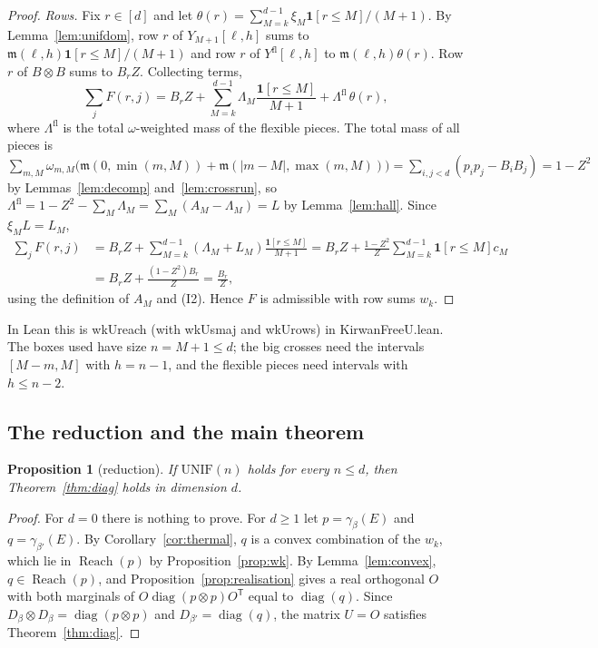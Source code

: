 \documentclass[11pt]{amsart}
\newtheorem{proposition}[lemma]{Proposition}
\theoremstyle{definition}
\theoremstyle{remark}
\numberwithin{equation}{section}
\newcommand{\diag}{\operatorname{diag}}
\newcommand{\Reach}{\operatorname{Reach}}
\newcommand{\ind}[1]{\mathbf{1}[#1]}
\newcommand{\ms}{\mathfrak{m}}
\newcommand{\leanus}{\textunderscore\allowbreak}
\newcommand{\lean}[1]{{\ttfamily\let\_\leanus #1}}
\begin{document}
\begin{proof}
\emph{Rows.} Fix $r\in[d]$ and let $\theta(r)=\sum_{M=k}^{d-1}\xi_M\ind{r\le M}/(M+1)$. By
Lemma~\ref{lem:unifdom}, row $r$ of $Y_{M+1}[\ell,h]$ sums to $\ms(\ell,h)\ind{r\le M}/(M+1)$ and row
$r$ of $Y^{\mathrm{fl}}[\ell,h]$ to $\ms(\ell,h)\theta(r)$. Row $r$ of $B\otimes B$ sums to $B_rZ$.
Collecting terms,
\[
  \sum_jF(r,j)=B_rZ+\sum_{M=k}^{d-1}\Lambda_M\frac{\ind{r\le M}}{M+1}+\Lambda^{\mathrm{fl}}\,\theta(r),
\]
where $\Lambda^{\mathrm{fl}}$ is the total $\omega$-weighted mass of the flexible pieces. The total mass
of all pieces is
$\sum_{m,M}\omega_{m,M}\bigl(\ms(0,\min(m,M))+\ms(|m-M|,\max(m,M))\bigr)=\sum_{i,j<d}(p_ip_j-B_iB_j)=1-Z^2$ by
Lemmas~\ref{lem:decomp} and~\ref{lem:crossrun}, so
$\Lambda^{\mathrm{fl}}=1-Z^2-\sum_M\Lambda_M=\sum_M(A_M-\Lambda_M)=L$ by Lemma~\ref{lem:hall}. Since
$\xi_ML=L_M$,
\begin{align*}
  \sum_jF(r,j)&=B_rZ+\sum_{M=k}^{d-1}(\Lambda_M+L_M)\frac{\ind{r\le M}}{M+1}
  =B_rZ+\frac{1-Z^2}{Z}\sum_{M=k}^{d-1}\ind{r\le M}c_M\\
  &=B_rZ+\frac{(1-Z^2)B_r}{Z}=\frac{B_r}{Z},
\end{align*}
using the definition of $A_M$ and (I2). Hence $F$ is admissible with row sums $w_k$.
\end{proof}

In Lean this is \lean{wkU\_reach} (with \lean{wkU\_smaj} and \lean{wkU\_rows}) in
\lean{KirwanFreeU.lean}. The boxes used have size $n=M+1\le d$; the big crosses need the intervals
$[M-m,M]$ with $h=n-1$, and the flexible pieces need intervals with $h\le n-2$.

\subsection{The reduction and the main theorem}

\begin{proposition}[reduction]\label{prop:reduction}
If $\mathrm{UNIF}(n)$ holds for every $n\le d$, then Theorem~\ref{thm:diag} holds in dimension $d$.
\end{proposition}

\begin{proof}
For $d=0$ there is nothing to prove. For $d\ge1$ let $p=\gamma_\beta(E)$ and $q=\gamma_{\beta'}(E)$. By
Corollary~\ref{cor:thermal}, $q$ is a convex combination of the $w_k$, which lie in $\Reach(p)$ by
Proposition~\ref{prop:wk}. By Lemma~\ref{lem:convex}, $q\in\Reach(p)$, and
Proposition~\ref{prop:realisation} gives a real orthogonal $O$ with both marginals of
$O\diag(p\otimes p)O^{\mathsf T}$ equal to $\diag(q)$. Since $D_\beta\otimes D_\beta=\diag(p\otimes p)$
and $D_{\beta'}=\diag(q)$, the matrix $U=O$ satisfies Theorem~\ref{thm:diag}.
\end{proof}
\end{document}
